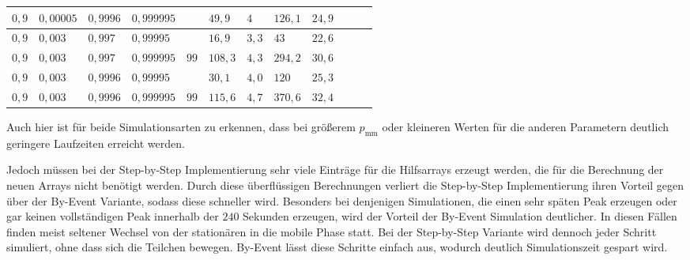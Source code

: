 \begin{table}[h]
\begin{tabular}{|l|l|l|l|l|l|l|l|l|l|l|l|}
$ 0,9  $ & $0,00005$ & $0,9996$ & $0,999995$ && $49,9   $ & $4 $     & $126,1 $ & $24,9 $  \\ \hline
$ 0,9  $ & $0,003 $  & $0,997$  & $0,99995$  && $16,9   $ & $3,3 $   & $43    $ & $22,6 $  \\ \hline
\cellcolor{gray!25}$ 0,9  $ & \cellcolor{gray!25}$0,003 $  & \cellcolor{gray!25}$0,997$  & \cellcolor{gray!25}$0,999995$ &$99$& $108,3$ & $4,3   $ & $294,2 $ & $30,6 $  \\ \hline
$ 0,9  $ & $0,003 $  & $0,9996$ & $0,99995$  && $30,1   $ & $4,0 $   & $120 $   & $25,3 $  \\ \hline
\cellcolor{gray!25}$ 0,9  $ & \cellcolor{gray!25}$0,003 $  & \cellcolor{gray!25}$0,9996$ & \cellcolor{gray!25}$0,999995$ &$99$& $115,6$ & $4,7   $ & $370,6 $ & $32,4$  \\ \hline
\end{tabular}
\end{table}
Auch hier ist für beide Simulationsarten zu erkennen, dass bei größerem $p_\text{mm}$ oder kleineren Werten für die anderen Parametern deutlich geringere Laufzeiten erreicht werden.

Jedoch müssen bei der Step-by-Step Implementierung sehr viele Einträge für die Hilfsarrays erzeugt werden, die für die Berechnung der neuen Arrays nicht benötigt werden. Durch diese überflüssigen Berechnungen verliert die Step-by-Step Implementierung ihren Vorteil gegen über der By-Event Variante, sodass diese schneller wird. Besonders bei denjenigen Simulationen, die einen sehr späten Peak erzeugen oder gar keinen vollständigen Peak innerhalb der $240$ Sekunden erzeugen, wird der Vorteil der By-Event Simulation deutlicher. In diesen Fällen finden meist seltener Wechsel von der stationären in die mobile Phase statt. Bei der Step-by-Step Variante wird dennoch jeder Schritt simuliert, ohne dass sich die Teilchen bewegen. By-Event lässt diese Schritte einfach aus, wodurch deutlich Simulationszeit gespart wird. 


